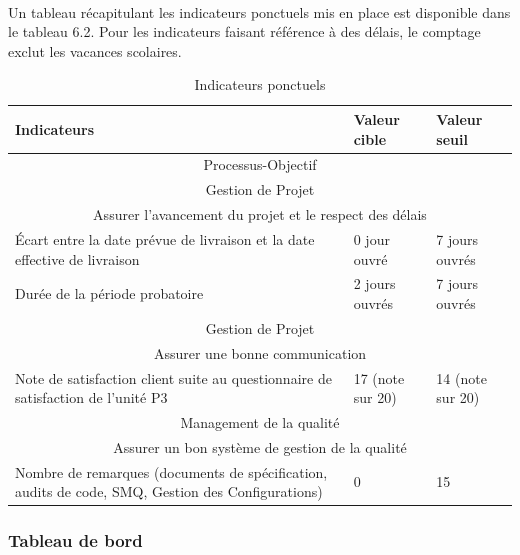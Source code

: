\paragraph*{} Un tableau récapitulant les indicateurs ponctuels mis en place est disponible dans le tableau
6.2. Pour les indicateurs faisant référence à des délais, le comptage exclut les vacances scolaires.
\begin{table}[H]

\begin{tabular}[h]{|p{}|p{}|p{}|}
	\hline
	\rowcolor[gray]{0.85}
	Indicateurs & Valeur cible & Valeur seuil \\\hline
	\multicolumn{3}{|c|}{Processus-Objectif} \\\hline
	\multicolumn{3}{|c|}{\cellcolor[gray]{0.85} Gestion de Projet} \\
	\multicolumn{3}{|c|}{\cellcolor[gray]{0.85} Assurer l'avancement du projet et le respect des délais} \\\hline
	Écart entre la date prévue de livraison et la date effective de livraison & 0 jour ouvré & 7 jours ouvrés  \\\hline
	Durée de la période probatoire & 2 jours ouvrés & 7 jours ouvrés \\\hline
	\multicolumn{3}{|c|}{\cellcolor[gray]{0.85} Gestion de Projet} \\
	\multicolumn{3}{|c|}{\cellcolor[gray]{0.85} Assurer une bonne communication} \\\hline
	Note de satisfaction client suite au questionnaire de satisfaction de l'unité P3 & 17 (note sur 20) & 14 (note sur 20) \\\hline
	\multicolumn{3}{|c|}{\cellcolor[gray]{0.85} Management de la qualité} \\
	\multicolumn{3}{|c|}{\cellcolor[gray]{0.85} Assurer un bon système de gestion de la qualité} \\\hline
	Nombre de remarques (documents de spécification, audits de code, SMQ, Gestion des Configurations) & 0 & 15 \\\hline
	
\end{tabular}
\caption{Indicateurs ponctuels} \label{Tableau 6.2}
\end{table}

\subsubsection*{Tableau de bord}
\label{Tableau de bord}

